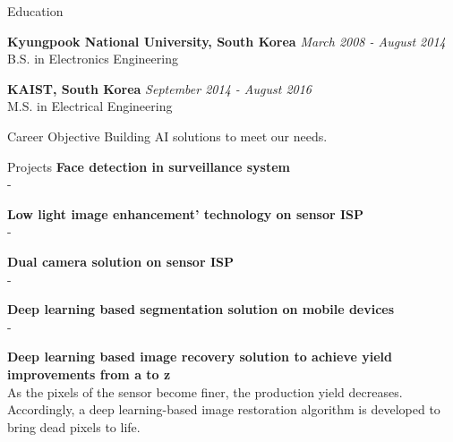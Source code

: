 \documentclass{resume}
\begin{document}
\begin{rSection}{Education}


{\bf Kyungpook National University, South Korea} \hfill {\em March 2008 - August 2014} 
\\ B.S. in Electronics Engineering\hfill 

{\bf KAIST, South Korea} \hfill {\em September 2014 - August 2016} 
\\ M.S. in Electrical Engineering\hfill

\end{rSection}

\begin{rSection}{Career Objective}
 Building AI solutions to meet our needs.
\end{rSection}

\begin{rSection}{Projects}
{\bf Face detection in surveillance system }
\\-

{\bf Low light image enhancement' technology on sensor ISP}
\\-

{\bf Dual camera solution on sensor ISP}
\\-

{\bf Deep learning based segmentation solution on mobile devices}
\\-

{\bf Deep learning based image recovery solution to achieve yield improvements from a to z}
\\As the pixels of the sensor become finer, the production yield decreases. Accordingly, a deep learning-based image restoration algorithm is developed to bring dead pixels to life.

\end{rSection}
\end{document}
